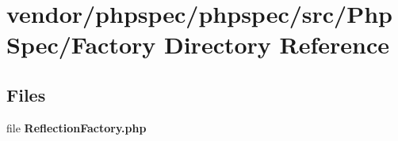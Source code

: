 \section{vendor/phpspec/phpspec/src/\+Php\+Spec/\+Factory Directory Reference}
\label{dir_587920ef6aabd33e545ce5d2373f3820}
\subsection*{Files}
\begin{DoxyCompactItemize}
\item 
file {\bf Reflection\+Factory.\+php}
\end{DoxyCompactItemize}
